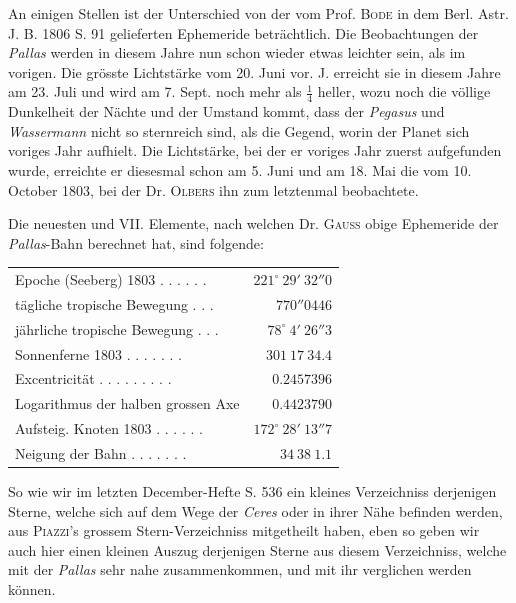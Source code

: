 An einigen Stellen ist der Unterschied von der vom Prof. \textsc{Bode} in dem Berl. Astr. J. B. 1806 S. 91 gelieferten Ephemeride beträchtlich. Die Beobachtungen der \emph{Pallas} werden in diesem Jahre nun schon wieder etwas leichter sein, als im vorigen. Die grösste Lichtstärke vom 20. Juni vor. J. erreicht sie in diesem Jahre am 23. Juli und wird am 7. Sept. noch mehr als $\frac{1}{4}$ heller, wozu noch die völlige Dunkelheit der Nächte und der Umstand kommt, dass der \emph{Pegasus} und \emph{Wassermann} nicht so sternreich sind, als die Gegend, worin der Planet sich voriges Jahr aufhielt. Die Lichtstärke, bei der er voriges Jahr zuerst aufgefunden wurde, erreichte er diesesmal schon am 5. Juni und am 18. Mai die vom 10. October 1803, bei der Dr. \textsc{Olbers} ihn zum letztenmal beobachtete.

Die neuesten und VII. Elemente, nach welchen Dr. \textsc{Gauss} obige Ephemeride der \emph{Pallas}-Bahn berechnet hat, sind folgende:

\begin{center}
\begingroup\fontsize{9}{11}\selectfont\setlength{\tabcolsep}{3pt}
\begin{tabular}{lr}
Epoche (Seeberg) 1803 . . . . . . & $221^\circ\ 29'\ 32''0$ \\
tägliche tropische Bewegung . . . & $770''0446$ \\
jährliche tropische Bewegung . . . & $78^\circ\ 4'\ 26''3$ \\
Sonnenferne 1803 . . . . . . . & $301\ 17\ 34.4$ \\
Excentricität . . . . . . . . . & $0.2457396$ \\
Logarithmus der halben grossen Axe  & $0.4423790$ \\
Aufsteig. Knoten 1803 . . . . . . & $172^\circ\ 28'\ 13''7$ \\
Neigung der Bahn . . . . . . . & $34\ 38\ 1.1$ \\
\end{tabular}\endgroup
\end{center}
%

So wie wir im letzten December-Hefte S. 536 ein kleines Verzeichniss derjenigen Sterne, welche sich auf dem Wege der \emph{Ceres} oder in ihrer Nähe befinden werden, aus \textsc{Piazzi}'s grossem Stern-Verzeichniss mitgetheilt haben, eben so geben wir auch hier einen kleinen Auszug derjenigen Sterne aus diesem Verzeichniss, welche mit der \emph{Pallas} sehr nahe zusammenkommen, und mit ihr verglichen werden können.

